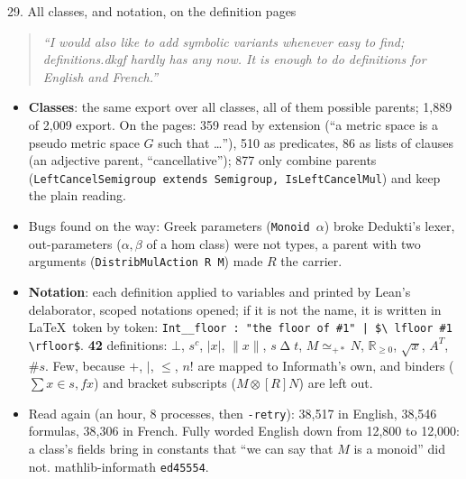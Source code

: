 \documentclass[10pt,aspectratio=169]{beamer}
\newcommand{\bad}[1]{\textcolor{warn}{#1}}
\newcommand{\ok}[1]{\textcolor{good}{#1}}
\newcommand{\commit}[1]{\texttt{\footnotesize #1}}
\newcommand{\prompt}[1]{\begin{quote}\small\itshape ``#1''\end{quote}}
\begin{document}
\begin{frame}{29. All classes, and notation, on the definition pages}
  \footnotesize
  \prompt{I would also like to add symbolic variants whenever easy to find; definitions.dkgf
  hardly has any now. It is enough to do definitions for English and French.}
  \begin{itemize}
    \item \textbf{Classes}: the same export over all classes, all of them possible parents;
          1,889 of 2,009 export. On the pages: \ok{359 read by extension} (``a metric space is a
          pseudo metric space $G$ such that \ldots''), \ok{510 as predicates}, 86 as lists of
          clauses (an adjective parent, ``cancellative''); \bad{877 only combine parents}
          (\texttt{LeftCancelSemigroup extends Semigroup, IsLeftCancelMul}) and keep the plain
          reading.
    \item Bugs found on the way: Greek parameters (\texttt{Monoid $\alpha$}) broke Dedukti's lexer,
          out-parameters ($\alpha, \beta$ of a hom class) were not types, a parent with two
          arguments (\texttt{DistribMulAction R M}) made $R$ the carrier.
    \item \textbf{Notation}: each definition applied to variables and printed by Lean's
          delaborator, scoped notations opened; if it is not the name, it is written in \LaTeX\
          token by token: \texttt{Int\_\_floor : "the floor of \#1" | \$\textbackslash
          lfloor \#1 \textbackslash rfloor\$}. \textbf{42} definitions: $\bot$, $s^c$, $|x|$,
          $\|x\|$, $s \mathbin{\Delta} t$, $M \simeq_{+*} N$, $\mathbb{R}_{\geq 0}$,
          $\sqrt{x}$, $A^T$, $\# s$. Few, because $+$, $\mid$, $\leq$, $n!$ are mapped to
          Informath's own, and binders (\bad{$\sum x \in s, f x$}) and bracket subscripts
          (\bad{$M \otimes[R] N$}) are left out.
    \item Read again (an hour, 8 processes, then \texttt{-retry}): 38,517 in English, 38,546
          formulas, 38,306 in French. Fully worded English \bad{down} from 12,800 to 12,000: a
          class's fields bring in constants that ``we can say that $M$ is a monoid'' did not.
          mathlib-informath \commit{ed45554}.
  \end{itemize}
\end{frame}
\end{document}
